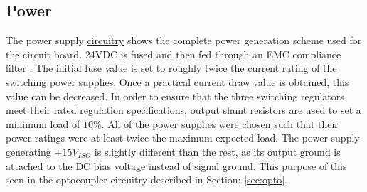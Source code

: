 \subsection {Power}

The power supply \hyperlink{sch:Power}{circuitry} shows the complete power generation scheme used for the circuit board. 24VDC is fused and then fed through an EMC compliance filter \cite{5VswitchDatasheet}. The initial fuse value is set to roughly twice the current rating of the switching power supplies. Once a practical current draw value is obtained, this value can be decreased. In order to ensure that the three switching regulators meet their rated regulation specifications, output shunt resistors are used to set a minimum load of $10\%$. All of the power supplies were chosen such that their power ratings were at least twice the maximum expected load. The power supply generating $\pm 15V_{ISO}$ is slightly different than the rest, as its output ground is attached to the DC bias voltage instead of signal ground. This purpose of this seen in the optocoupler circuitry described in Section: \ref{sec:opto}.  

